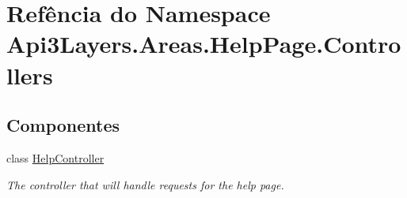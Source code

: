 \hypertarget{namespaceApi3Layers_1_1Areas_1_1HelpPage_1_1Controllers}{}\section{Refência do Namespace Api3\+Layers.\+Areas.\+Help\+Page.\+Controllers}
\label{namespaceApi3Layers_1_1Areas_1_1HelpPage_1_1Controllers}
\subsection*{Componentes}
\begin{DoxyCompactItemize}
\item 
class \hyperlink{classApi3Layers_1_1Areas_1_1HelpPage_1_1Controllers_1_1HelpController}{Help\+Controller}
\begin{DoxyCompactList}\small\item\em The controller that will handle requests for the help page. \end{DoxyCompactList}\end{DoxyCompactItemize}
